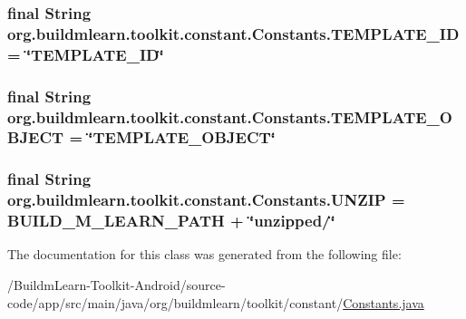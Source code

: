 \hypertarget{classorg_1_1buildmlearn_1_1toolkit_1_1constant_1_1Constants_a2ee9d59d6a353dc4664ed2e2086dae9d}{
\subsubsection[{T\-E\-M\-P\-L\-A\-T\-E\-\_\-\-I\-D}]{\setlength{\rightskip}{0pt plus 5cm}final String org.\-buildmlearn.\-toolkit.\-constant.\-Constants.\-T\-E\-M\-P\-L\-A\-T\-E\-\_\-\-I\-D = \char`\"{}T\-E\-M\-P\-L\-A\-T\-E\-\_\-\-I\-D\char`\"{}\hspace{0.3cm}{\ttfamily [static]}}}\label{classorg_1_1buildmlearn_1_1toolkit_1_1constant_1_1Constants_a2ee9d59d6a353dc4664ed2e2086dae9d}
\hypertarget{classorg_1_1buildmlearn_1_1toolkit_1_1constant_1_1Constants_a9e2658a69f3f70584955bbdc947ca0bc}{
\subsubsection[{T\-E\-M\-P\-L\-A\-T\-E\-\_\-\-O\-B\-J\-E\-C\-T}]{\setlength{\rightskip}{0pt plus 5cm}final String org.\-buildmlearn.\-toolkit.\-constant.\-Constants.\-T\-E\-M\-P\-L\-A\-T\-E\-\_\-\-O\-B\-J\-E\-C\-T = \char`\"{}T\-E\-M\-P\-L\-A\-T\-E\-\_\-\-O\-B\-J\-E\-C\-T\char`\"{}\hspace{0.3cm}{\ttfamily [static]}}}\label{classorg_1_1buildmlearn_1_1toolkit_1_1constant_1_1Constants_a9e2658a69f3f70584955bbdc947ca0bc}
\hypertarget{classorg_1_1buildmlearn_1_1toolkit_1_1constant_1_1Constants_aa7187aa1863aeed8b73d71e3d203fe3c}{
\subsubsection[{U\-N\-Z\-I\-P}]{\setlength{\rightskip}{0pt plus 5cm}final String org.\-buildmlearn.\-toolkit.\-constant.\-Constants.\-U\-N\-Z\-I\-P = {\bf B\-U\-I\-L\-D\-\_\-\-M\-\_\-\-L\-E\-A\-R\-N\-\_\-\-P\-A\-T\-H} + \char`\"{}unzipped/\char`\"{}\hspace{0.3cm}{\ttfamily [static]}}}\label{classorg_1_1buildmlearn_1_1toolkit_1_1constant_1_1Constants_aa7187aa1863aeed8b73d71e3d203fe3c}


The documentation for this class was generated from the following file\-:\begin{DoxyCompactItemize}
\item 
/\-Buildm\-Learn-\/\-Toolkit-\/\-Android/source-\/code/app/src/main/java/org/buildmlearn/toolkit/constant/\hyperlink{Constants_8java}{Constants.\-java}\end{DoxyCompactItemize}
